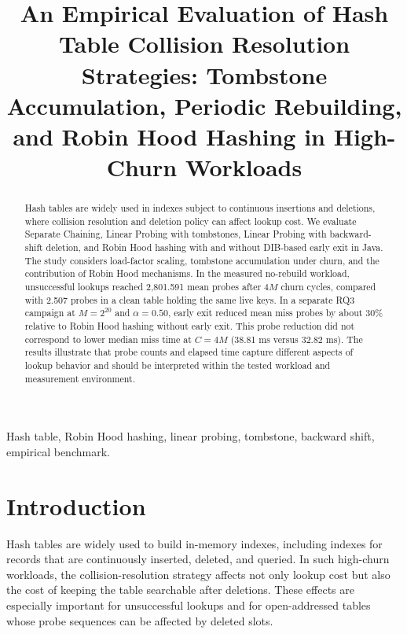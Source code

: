 \documentclass[conference]{IEEEtran}
\begin{document}
\title{An Empirical Evaluation of Hash Table Collision Resolution Strategies: Tombstone Accumulation, Periodic Rebuilding, and Robin Hood Hashing in High-Churn Workloads}

\author{
}

\maketitle

\begin{abstract}
Hash tables are widely used in indexes subject to continuous insertions and
deletions, where collision resolution and deletion policy can affect lookup
cost. We evaluate Separate Chaining, Linear Probing with tombstones, Linear
Probing with backward-shift deletion, and Robin Hood hashing with and without
DIB-based early exit in Java. The study considers load-factor scaling,
tombstone accumulation under churn, and the contribution of Robin Hood
mechanisms. In the measured no-rebuild workload, unsuccessful lookups reached
2,801.591 mean probes after $4M$ churn cycles, compared with 2.507 probes in a
clean table holding the same live keys. In a separate RQ3 campaign at
$M=2^{20}$ and $\alpha=0.50$, early exit reduced mean miss probes by about
30\% relative to Robin Hood hashing without early exit. This probe reduction
did not correspond to lower median miss time at $C=4M$ (38.81 ms versus
32.82 ms). The results illustrate that probe counts and elapsed time capture
different aspects of lookup behavior and should be interpreted within the
tested workload and measurement environment.
\end{abstract}

\begin{IEEEkeywords}
Hash table, Robin Hood hashing, linear probing, tombstone, backward shift, empirical benchmark.
\end{IEEEkeywords}

\section{Introduction}
Hash tables are widely used to build in-memory indexes, including indexes for
records that are continuously inserted, deleted, and queried. In such
high-churn workloads, the collision-resolution strategy affects not only
lookup cost but also the cost of keeping the table searchable after deletions.
These effects are especially important for unsuccessful lookups and for
open-addressed tables whose probe sequences can be affected by deleted slots.
\end{document}
